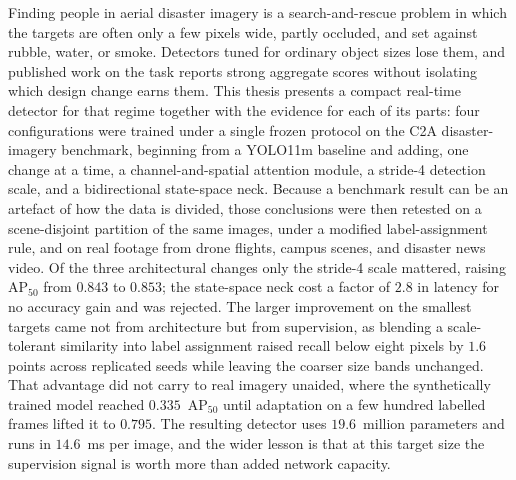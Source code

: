\documentclass[12pt,a4paper,oneside]{report}
\begin{document}
Finding people in aerial disaster imagery is a search-and-rescue problem in
which the targets are often only a few pixels wide, partly occluded, and set
against rubble, water, or smoke. Detectors tuned for ordinary object sizes lose
them, and published work on the task reports strong aggregate scores without
isolating which design change earns them. This thesis presents a compact
real-time detector for that regime together with the evidence for each of its
parts: four configurations were trained under a single frozen protocol on the
C2A disaster-imagery benchmark, beginning from a YOLO11m baseline and adding,
one change at a time, a channel-and-spatial attention module, a stride-4
detection scale, and a bidirectional state-space neck. Because a benchmark
result can be an artefact of how the data is divided, those conclusions were
then retested on a scene-disjoint partition of the same images, under a
modified label-assignment rule, and on real footage from drone flights, campus
scenes, and disaster news video. Of the three architectural changes only the
stride-4 scale mattered, raising $\mathrm{AP}_{50}$ from $0.843$ to $0.853$;
the state-space neck cost a factor of $2.8$ in latency for no accuracy gain and
was rejected. The larger improvement on the smallest targets came not from
architecture but from supervision, as blending a scale-tolerant similarity into
label assignment raised recall below eight pixels by $1.6$ points across
replicated seeds while leaving the coarser size bands unchanged. That advantage
did not carry to real imagery unaided, where the synthetically trained model
reached $0.335$~$\mathrm{AP}_{50}$ until adaptation on a few hundred labelled
frames lifted it to $0.795$. The resulting detector uses $19.6$~million
parameters and runs in $14.6$~ms per image, and the wider lesson is that at
this target size the supervision signal is worth more than added network
capacity.
\clearpage
 \newpage        %

\begingroup\tocstretch\setlength{\parskip}{0pt}\tableofcontents\endgroup

\clearpage
{}
\begingroup\tocstretch\setlength{\parskip}{0pt}%
  \renewcommand{\addvspace}[1]{}\listoftables\endgroup
\end{document}
